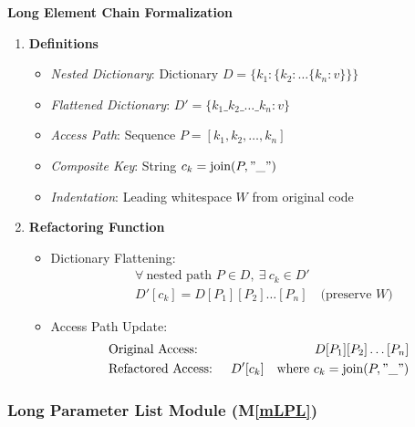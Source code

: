 \documentclass[12pt, titlepage]{article}
\newcommand{\mref}[1]{M\ref{#1}}
\begin{document}
\textbf{Long Element Chain Formalization}
\begin{enumerate}
  \item \textbf{Definitions}
  \begin{itemize}
      \item \textit{Nested Dictionary}: Dictionary \( D = \{k_1: \{k_2: \dots \{k_n: v\}\}\} \)
      \item \textit{Flattened Dictionary}: \( D' = \{k_1\_k_2\_\dots\_k_n: v\} \)
      \item \textit{Access Path}: Sequence \( P = [k_1, k_2, \dots, k_n] \)
      \item \textit{Composite Key}: String \( c_k = \text{join}(P, "\_") \)
      \item \textit{Indentation}: Leading whitespace \( W \) from original code
  \end{itemize}

  \item \textbf{Refactoring Function}
  \begin{itemize}
      \item Dictionary Flattening:
      \[
      \begin{aligned}
          &\forall\ \text{nested path } P \in D,\ \exists\ c_k \in D' \\
          &D'[c_k] = D[P_1][P_2]\dots[P_n] \quad \text{(preserve } W\text{)}
      \end{aligned}
      \]
      
      \item Access Path Update:
      \[
      \begin{aligned}
          &\text{Original Access: } &D[P_1][P_2]\dots[P_n] \\
          &\text{Refactored Access: } &D'[c_k] \quad \text{where } c_k = \text{join}(P, "\_") 
      \end{aligned}
      \]
  \end{itemize}
\end{enumerate}

\subsubsection{Long Parameter List Module (\mref{mLPL})}

\end{document}
